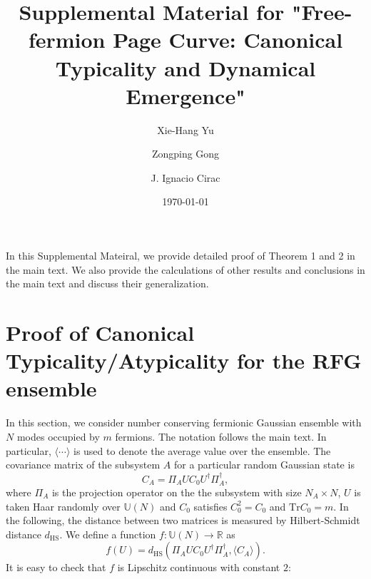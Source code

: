 \documentclass[aps,onecolumn,nofootinbib,superscriptaddress,notitlepage,longbibliography]{revtex4-1}
\def \Tr {\mathrm{Tr}}
\begin{document}
	
	
	
\title{Supplemental Material for "Free-fermion Page Curve: Canonical Typicality and Dynamical Emergence"}

\author{Xie-Hang Yu}
\author{Zongping Gong}
\author{J. Ignacio Cirac}
\date{\today}
\maketitle
	
\tableofcontents



In this Supplemental Mateiral, we provide detailed proof of Theorem 1 and 2 in the main text. We also provide the calculations of other results and conclusions in the main text and discuss their generalization.

\section{Proof of Canonical Typicality/Atypicality for the RFG ensemble}

In this section, we consider number conserving fermionic
Gaussian ensemble with $N$ modes occupied by $m$ fermions. The
notation follows the main text. In particular, %
$\langle\cdots\rangle$ is
used to denote the average value over the ensemble. The covariance
matrix of the subsystem $A$ for a particular random Gaussian state
is 
\begin{equation}
C_{A}=\Pi_{A}UC_{0}U^{\dagger}\Pi_{A}^{\dagger},
\end{equation}
where $\Pi_{A}$ is the projection operator on the the subsystem with size
$N_{A}\times N$, $U$ %
is taken Haar randomly over $\mathbb{U}(N)$ and
$C_{0}$ satisfies $C_{0}^{2}=C_{0}$ and $\Tr C_{0}=m$. In the following,
the distance between two matrices is measured by Hilbert-Schmidt distance
$d_{\mathrm{HS}}$. We define a function $f:\mathbb{U}(N)\to\mathbb{R}$
as
\begin{equation}
f(U)=d_{\mathrm{HS}}(\Pi_{A}UC_{0}U^{\dagger}\Pi_{A}^{\dagger},\langle C_{A}\rangle).
\end{equation}
It is easy to check that $f$ is Lipschitz continuous with constant
$2$:
\end{document}
